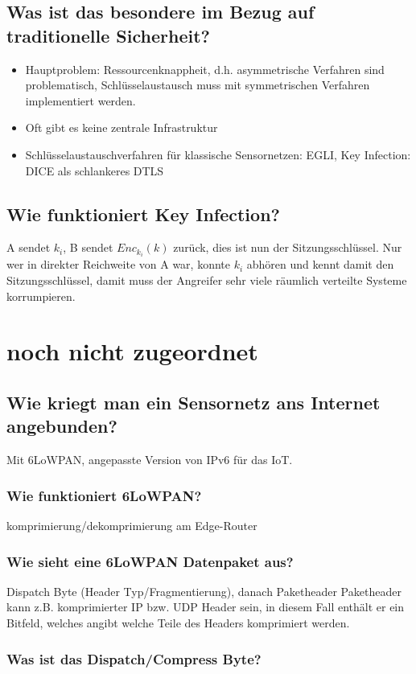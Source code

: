 	\subsection{Was ist das besondere im Bezug auf traditionelle Sicherheit?}
	\begin{itemize}
		\item Hauptproblem: Ressourcenknappheit, d.h. asymmetrische Verfahren sind problematisch, Schlüsselaustausch muss mit symmetrischen Verfahren implementiert werden.
		\item Oft gibt es keine zentrale Infrastruktur
		\item Schlüsselaustauschverfahren für klassische Sensornetzen: EGLI, Key Infection: DICE als schlankeres DTLS
	\end{itemize}
	
	\subsection{Wie funktioniert Key Infection?}
	A sendet $k_i$, B sendet $Enc_{k_i}(k)$ zurück, dies ist nun der Sitzungsschlüssel.
	Nur wer in direkter Reichweite von A war, konnte $k_i$ abhören und kennt damit den Sitzungsschlüssel, damit muss der Angreifer sehr viele räumlich verteilte Systeme korrumpieren.
\section{noch nicht zugeordnet}
	\subsection{Wie kriegt man ein Sensornetz ans Internet angebunden?}
		Mit 6LoWPAN, angepasste Version von IPv6 für das IoT.
		
		\subsubsection{Wie funktioniert 6LoWPAN?}
		komprimierung/dekomprimierung am Edge-Router
		\subsubsection{Wie sieht eine 6LoWPAN Datenpaket aus?}
		Dispatch\- Byte (Header\- Typ/Fragmentierung), danach Paketheader
		Paketheader kann z.B. komprimierter IP\-  bzw. UDP\- Header sein, in diesem Fall enthält er ein Bitfeld, welches angibt welche Teile des Headers komprimiert werden.
		\subsubsection{Was ist das Dispatch/Compress Byte?}
